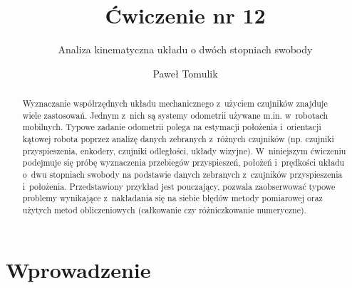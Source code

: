 \documentclass[paper=a4,DIV=12]{tmmlab}
\begin{document}
\title{Ćwiczenie nr 12}
\subtitle{Analiza kinematyczna układu o dwóch stopniach swobody}
\author{Paweł Tomulik}
\date{}
\maketitle

\begin{abstract}
  Wyznaczanie współrzędnych układu mechanicznego z~użyciem czujników znajduje
  wiele zastosowań. Jednym z~nich są systemy odometrii używane m.in. w~robotach
  mobilnych. Typowe zadanie odometrii polega na estymacji położenia
  i~orientacji kątowej robota poprzez analizę danych zebranych z~różnych
  czujników (np. czujniki przyspieszenia, enkodery, czujniki odległości, układy
  wizyjne). W~niniejszym ćwiczeniu podejmuje się próbę wyznaczenia przebiegów
  przyspieszeń, położeń i~prędkości układu o~dwu stopniach swobody na podstawie
  danych zebranych z~czujników przyspieszenia i~położenia. Przedstawiony
  przykład jest pouczający, pozwala zaobserwować typowe problemy wynikające
  z~nakładania się na siebie błędów metody pomiarowej oraz użytych metod
  obliczeniowych (całkowanie czy różniczkowanie numeryczne).
\end{abstract}

\section{Wprowadzenie}
\label{sec:BP9CM}
\end{document}
